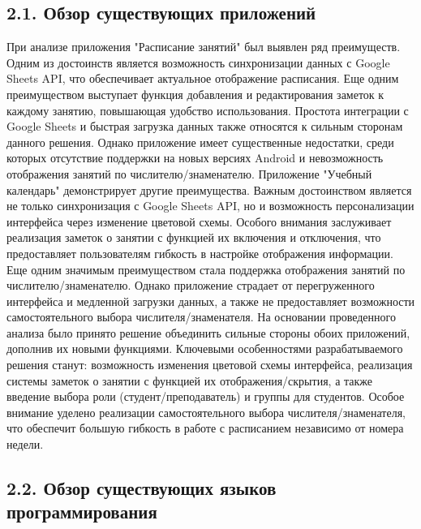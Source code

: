 \documentclass{vsureport}
\begin{document}
\subsection*{2.1. Обзор существующих приложений}
При анализе приложения "Расписание занятий" был выявлен ряд преимуществ. Одним из достоинств является возможность синхронизации данных с Google Sheets API, что обеспечивает актуальное отображение расписания. Еще одним преимуществом выступает функция добавления и редактирования заметок к каждому занятию, повышающая удобство использования. Простота интеграции с Google Sheets и быстрая загрузка данных также относятся к сильным сторонам данного решения. Однако приложение имеет существенные недостатки, среди которых отсутствие поддержки на новых версиях Android и невозможность отображения занятий по числителю/знаменателю. \cite{ref2}
Приложение "Учебный календарь" демонстрирует другие преимущества. Важным достоинством является не только синхронизация с Google Sheets API, но и возможность персонализации интерфейса через изменение цветовой схемы. Особого внимания заслуживает реализация заметок о занятии с функцией их включения и отключения, что предоставляет пользователям гибкость в настройке отображения информации. Еще одним значимым преимуществом стала поддержка отображения занятий по числителю/знаменателю. Однако приложение страдает от перегруженного интерфейса и медленной загрузки данных, а также не предоставляет возможности самостоятельного выбора числителя/знаменателя.
На основании проведенного анализа было принято решение объединить сильные стороны обоих приложений, дополнив их новыми функциями. Ключевыми особенностями разрабатываемого решения станут: возможность изменения цветовой схемы интерфейса, реализация системы заметок о занятии с функцией их отображения/скрытия, а также введение выбора роли (студент/преподаватель) и группы для студентов. Особое внимание уделено реализации самостоятельного выбора числителя/знаменателя, что обеспечит большую гибкость в работе с расписанием независимо от номера недели.

\subsection*{2.2. Обзор существующих языков программирования}
\end{document}
